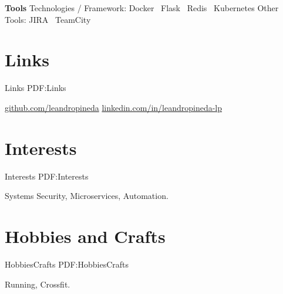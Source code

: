 \documentclass[letterpaper,MMMyyyy,nonstop]{simpleresumecv}
\begin{document}
\begin{body}
\textbf{Tools}
\BulletItem
Technologies / Framework: Docker \SubBulletSymbol\, Flask \SubBulletSymbol\, Redis \SubBulletSymbol\, Kubernetes
\BulletItem
Other Tools: JIRA \SubBulletSymbol\, TeamCity



\section
{Links}
{Links}
{PDF:Links}

\BulletItem
\href{https://github.com/leandropineda}{github.com/leandropineda}
\BulletItem
\href{https://www.linkedin.com/in/leandropineda-lp}{linkedin.com/in/leandropineda-lp}


\section
{Interests}
{Interests}
{PDF:Interests}

Systems Security, Microservices, Automation.


\section
{Hobbies \newline
	and Crafts}
{HobbiesCrafts}
{PDF:HobbiesCrafts}

Running, Crossfit.



\end{body}
\end{document}
